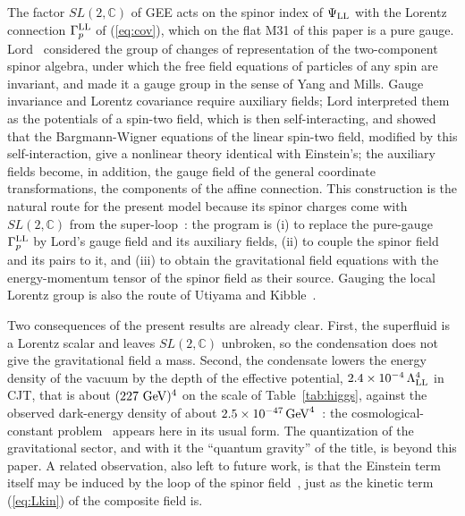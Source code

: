 \documentclass[aps,prd,twocolumn,superscriptaddress,nofootinbib,floatfix,longbibliography]{revtex4-2}
\newcommand{\LL}{{\rm LL}}
\begin{document}
The factor $SL(2,\mathbb C)$ of GEE acts on the spinor index of $\Psi_\LL$ with the Lorentz connection $\Gamma^\LL_p$ of
(\ref{eq:cov}), which on the flat M31 of this paper is a pure gauge. Lord~\cite{Lord1971} considered the group of changes of
representation of the two-component spinor algebra, under which the free field equations of particles of any spin are
invariant, and made it a gauge group in the sense of Yang and Mills. Gauge invariance and Lorentz covariance require
auxiliary fields; Lord interpreted them as the potentials of a spin-two field, which is then self-interacting, and showed
that the Bargmann-Wigner equations of the linear spin-two field, modified by this self-interaction, give a nonlinear theory
identical with Einstein's; the auxiliary fields become, in addition, the gauge field of the general coordinate
transformations, the components of the affine connection. This construction is the natural route for the present model
because its spinor charges come with $SL(2,\mathbb C)$ from the super-loop~\cite{Nash2026}: the program is (i) to replace the
pure-gauge $\Gamma^\LL_p$ by Lord's gauge field and its auxiliary fields, (ii) to couple the spinor field and its pairs to
it, and (iii) to obtain the gravitational field equations with the energy-momentum tensor of the spinor field as their
source. Gauging the local Lorentz group is also the route of Utiyama and Kibble~\cite{Utiyama1956,Kibble1961,Hehl1976}.

Two consequences of the present results are already clear. First, the superfluid is a Lorentz scalar and leaves
$SL(2,\mathbb C)$ unbroken, so the condensation does not give the gravitational field a mass. Second, the condensate lowers
the energy density of the vacuum by the depth of the effective potential, $2.4\times10^{-4}\,\Lambda_\LL^4$ in CJT, that is about
$(227\ {\rm GeV})^4$ on the scale of Table~\ref{tab:higgs}, against the observed dark-energy density of about
$2.5\times10^{-47}\,{\rm GeV}^4$~\cite{PDG2024}: the cosmological-constant problem~\cite{Weinberg1989} appears here in its usual
form. The quantization of the gravitational sector, and with it the ``quantum gravity'' of the title, is beyond this paper.
A related observation, also left to future work, is that the Einstein term itself may be induced by the loop of the spinor
field~\cite{Sakharov1967,Visser2002}, just as the kinetic term (\ref{eq:Lkin}) of the composite field is.

\end{document}
